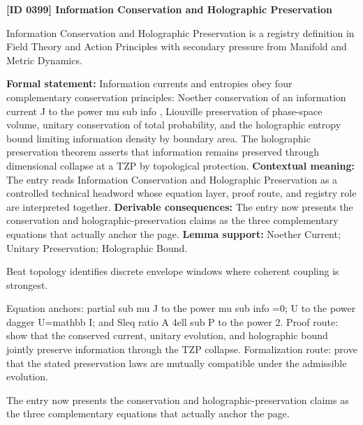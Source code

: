 \clearpage
\noindent\textbf{[ID 0399] Information Conservation and Holographic Preservation}\par
\vspace{0.35em}
\begingroup\small
{}
Information Conservation and Holographic Preservation is a registry definition in Field Theory and Action Principles with secondary pressure from Manifold and Metric Dynamics.

\begingroup\footnotesize\setlength{\emergencystretch}{3em}\sloppy
\textbf{Formal statement:} Information currents and entropies obey four complementary conservation principles: Noether conservation of an information current J to the power mu sub info , Liouville preservation of phase-space volume, unitary conservation of total probability, and the holographic entropy bound limiting information density by boundary area. The holographic preservation theorem asserts that information remains preserved through dimensional collapse at a TZP by topological protection. \textbf{Contextual meaning:} The entry reads Information Conservation and Holographic Preservation as a controlled technical headword whose equation layer, proof route, and registry role are interpreted together. \textbf{Derivable consequences:} The entry now presents the conservation and holographic-preservation claims as the three complementary equations that actually anchor the page. \textbf{Lemma support:} Noether Current; Unitary Preservation; Holographic Bound.\par
\endgroup

Beat topology identifies discrete envelope windows where coherent coupling is strongest.

Equation anchors: partial sub mu J to the power mu sub info =0; U to the power dagger U=mathbb I; and Sleq ratio A 4ell sub P to the power 2. Proof route: show that the conserved current, unitary evolution, and holographic bound jointly preserve information through the TZP collapse. Formalization route: prove that the stated preservation laws are mutually compatible under the admissible evolution.

The entry now presents the conservation and holographic-preservation claims as the three complementary equations that actually anchor the page.
\endgroup

